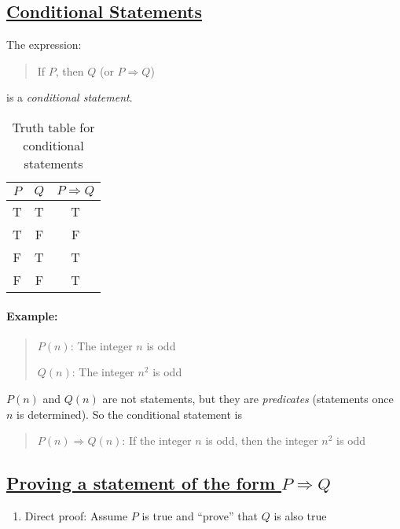 \documentclass[../main.tex]{subfiles}
\begin{document}
\subsection*{\underline{Conditional Statements}}

The expression:
\begin{quote}
    If $P$, then $Q$ (or $P \Rightarrow Q$)
\end{quote}
is a \emph{conditional statement}.
\begin{table}[ht]
    \centering
    \begin{tabular}{c|c|c}
        $P$ & $Q$ & $P \Rightarrow Q$ \\
        \hline
        T & T & T \\
        T & F & F \\
        F & T & T \\
        F & F & T
    \end{tabular}
    \caption{Truth table for conditional statements}
\end{table}

\paragraph{Example:}
\begin{quote}
    $P(n)$: The integer $n$ is odd

    $Q(n)$: The integer $n^2$ is odd
\end{quote}
$P(n)$ and $Q(n)$ are not statements, but they are \emph{predicates} (statements once $n$ is
determined). So the conditional statement is

\begin{quote}
    $P(n) \Rightarrow Q(n)$: If the integer $n$ is odd, then the integer $n^2$ is odd
\end{quote}

\subsection*{\underline{Proving a statement of the form $P \Rightarrow Q$}}

\begin{enumerate}
    \item Direct proof: Assume $P$ is true and ``prove'' that $Q$ is also true
\end{enumerate}


\newpage
{}
\end{document}
